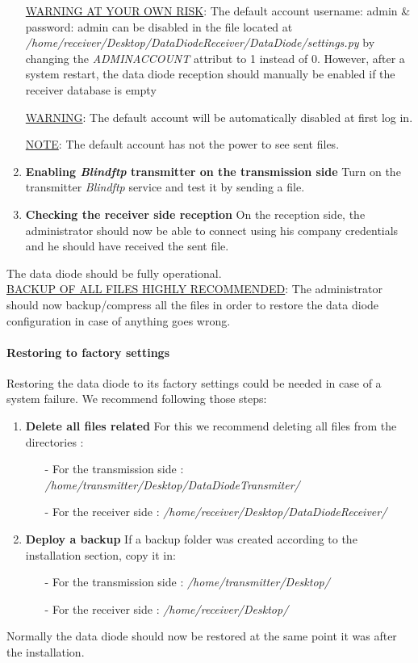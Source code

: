 \documentclass[a4paper,10pt]{article}
\begin{document}
\begin{enumerate}
\underline{WARNING AT YOUR OWN RISK}: The default account username: admin \& password: admin can be disabled in the file located at \emph{/home/receiver/Desktop/DataDiodeReceiver/DataDiode/settings.py} by changing the \emph{ADMINACCOUNT} attribut to 1 instead of 0. However, after a system restart, the data diode reception should manually be enabled if the receiver database is empty

\underline{WARNING}: The default account will be automatically disabled at first log in.

\underline{NOTE}: The default account has not the power to see sent files.

\item \textbf{Enabling \emph{Blindftp} transmitter on the transmission side} Turn on the transmitter \emph{Blindftp} service and test it by sending a file.

\item \textbf{Checking the receiver side reception} On the reception side, the administrator should now be able to connect using his company credentials and he should have received the sent file.

\end{enumerate}
The data diode should be fully operational. \\  
\underline{BACKUP OF ALL FILES HIGHLY RECOMMENDED}: The administrator should now backup/compress all the files in order to restore the data diode configuration in case of anything goes wrong.
\paragraph{Restoring to factory settings}
Restoring the data diode to its factory settings could be needed in case of a system failure. We recommend following those steps:

\begin{enumerate}
\item \textbf{Delete all files related}
	For this we recommend deleting all files from the directories  :
\begin{enumerate}
\item[-] For the transmission side : \emph{/home/transmitter/Desktop/DataDiodeTransmiter/}
\item[-] For the receiver side : \emph{/home/receiver/Desktop/DataDiodeReceiver/}
\end{enumerate}

\item \textbf{Deploy a backup} 
If a backup folder was created according to the installation section, copy it in:
\begin{enumerate}
\item[-] For the transmission side : \emph{/home/transmitter/Desktop/}
\item[-] For the receiver side : \emph{/home/receiver/Desktop/}
\end{enumerate}

\end{enumerate}
Normally the data diode should now be restored at the same point it was after the installation.
\bigskip
\end{document}
